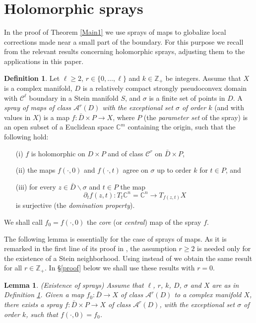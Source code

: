 \documentclass[11pt]{amsart}
\numberwithin{equation}{section}
\newtheorem{lemma}[theorem]{Lemma}
\theoremstyle{definition}
\newtheorem{definition}[theorem]{Definition}
\begin{document}
\section{Holomorphic sprays}
\label{spray}
In the proof of Theorem \ref{Main1} we use sprays of maps
to globalize
local corrections made near a small part of the boundary. 
For this purpose we recall from \cite{BDF1,BDF2,FFAsian} 
the relevant results concerning holomorphic sprays,
adjusting them to the applications in this paper.

\begin{definition}
\label{Spray}
Let $\ell\ge 2$,  $r\in\{0,\ldots,\ell\}$ and $k\in{\mathbb{Z}}_+$ be integers.
Assume that $X$ is a complex manifold, $D$ is a relatively compact 
strongly pseudoconvex domain with ${\mathcal{C}}^\ell$ boundary in a Stein manifold $S$,
and $\sigma$ is a finite set of points in $D$.
A {\em spray of maps of class ${\mathcal{A}}^r(D)$ with the 
exceptional set $\sigma$ of order $k$}
(and with values in $X$) is a map $f\colon \bar D\times P\to X$, where $P$ 
(the {\em parameter set} of the spray) is an open subset of 
a Euclidean space ${\mathbb{C}}^m$ containing the origin, 
such that the following hold: 
\begin{itemize}
\item[(i)]   $f$ is holomorphic on $D\times P$ and of class ${\mathcal{C}}^r$
on $\bar D \times P$, 
\item[(ii)] the maps $f(\cdotp,0)$ and $f(\cdotp,t)$ agree 
on $\sigma$ up to order $k$ for $t\in P$, and
\item[(iii)]  for every $z\in \bar D{\backslash} \sigma$ and $t\in P$  the map
\[
	{\partial}_t f(z,t) \colon T_t {\mathbb{C}}^n ={\mathbb{C}}^n  \to T_{f(z,t)} X
\]
is surjective (the {\em domination property}).
\end{itemize}
We shall call $f_0=f(\cdotp,0)$ the {\em core} 
(or {\em central}\/) map of the spray $f$. 
\end{definition}

The following lemma is essentially \cite[Lemma 4.2]{BDF1} 
for the case of sprays of maps. As it is remarked in the first line of its proof
in \cite{BDF1}, the assumption $r\ge 2$ is needed only for the existence of a Stein neighborhood. 
Using \cite[Corollary  1.3]{FFAsian} instead of \cite[Theorem 2.6]{BDF1} we obtain
the same result for all $r\in{\mathbb{Z}}_+$. In \S\ref{proof} below we shall use
these results with $r=0$.

\begin{lemma}
\label{sprays-exist}
{\em (Existence of sprays)} 
Assume that $\ell$, $r$, $k$, $D$, $\sigma$ and $X$ are as in 
Definition \ref{Spray}.  Given a map 
$f_0\colon \bar D\to X$ of class ${\mathcal{A}}^r(D)$ to 
a complex manifold $X$, there exists a spray 
$f\colon \bar D\times P\to X$ of class ${\mathcal{A}}^r(D)$, 
with the exceptional set $\sigma$ of order $k$, such that 
$f(\cdotp,0)=f_0$.  
\end{lemma}
\end{document}
